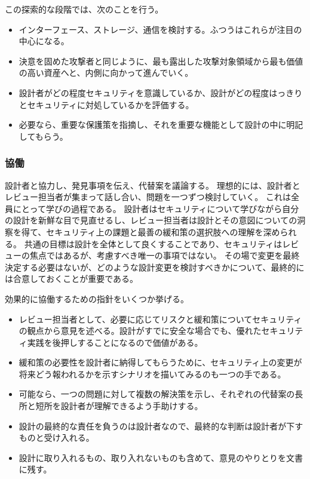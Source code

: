 \documentclass[uplatex]{jsarticle}
\begin{document}
この探索的な段階では、次のことを行う。
\begin{itemize}
\item インターフェース、ストレージ、通信を検討する。ふつうはこれらが注目の中心になる。
\item 決意を固めた攻撃者と同じように、最も露出した攻撃対象領域から最も価値の高い資産へと、内側に向かって進んでいく。
\item 設計者がどの程度セキュリティを意識しているか、設計がどの程度はっきりとセキュリティに対処しているかを評価する。
\item 必要なら、重要な保護策を指摘し、それを重要な機能として設計の中に明記してもらう。
\end{itemize}

\subsubsection{協働}

設計者と協力し、発見事項を伝え、代替案を議論する。
理想的には、設計者とレビュー担当者が集まって話し合い、問題を一つずつ検討していく。
これは全員にとって学びの過程である。
設計者はセキュリティについて学びながら自分の設計を新鮮な目で見直せるし、レビュー担当者は設計とその意図についての洞察を得て、セキュリティ上の課題と最善の緩和策の選択肢への理解を深められる。
共通の目標は設計を全体として良くすることであり、セキュリティはレビューの焦点ではあるが、考慮すべき唯一の事項ではない。
その場で変更を最終決定する必要はないが、どのような設計変更を検討すべきかについて、最終的には合意しておくことが重要である。

効果的に協働するための指針をいくつか挙げる。
\begin{itemize}
\item レビュー担当者として、必要に応じてリスクと緩和策についてセキュリティの観点から意見を述べる。設計がすでに安全な場合でも、優れたセキュリティ実践を後押しすることになるので価値がある。
\item 緩和策の必要性を設計者に納得してもらうために、セキュリティ上の変更が将来どう報われるかを示すシナリオを描いてみるのも一つの手である。
\item 可能なら、一つの問題に対して複数の解決策を示し、それぞれの代替案の長所と短所を設計者が理解できるよう手助けする。
\item 設計の最終的な責任を負うのは設計者なので、最終的な判断は設計者が下すものと受け入れる。
\item 設計に取り入れるもの、取り入れないものも含めて、意見のやりとりを文書に残す。
\end{itemize}
\end{document}
